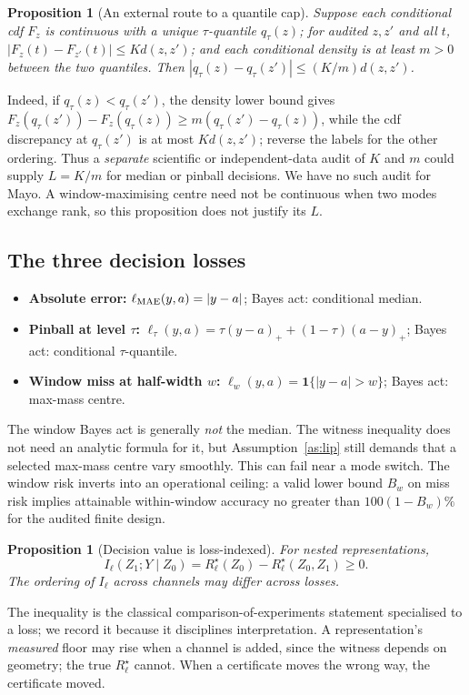 \documentclass[11pt]{article}
\newtheorem{proposition}[theorem]{Proposition}
\theoremstyle{definition}
\newcommand{\risk}{R^{\star}}
\newcommand{\ind}{\mathbf{1}}
\begin{document}
\begin{proposition}[An external route to a quantile cap]\label{prop:quantlip}
Suppose each conditional cdf $F_z$ is continuous with a unique $\tau$-quantile $q_\tau(z)$; for audited $z,z'$ and all $t$, $|F_z(t)-F_{z'}(t)|\le Kd(z,z')$; and each conditional density is at least $m>0$ between the two quantiles. Then $|q_\tau(z)-q_\tau(z')|\le(K/m)d(z,z')$.
\end{proposition}
Indeed, if $q_\tau(z)<q_\tau(z')$, the density lower bound gives $F_z(q_\tau(z'))-F_z(q_\tau(z))\ge m(q_\tau(z')-q_\tau(z))$, while the cdf discrepancy at $q_\tau(z')$ is at most $Kd(z,z')$; reverse the labels for the other ordering. Thus a \emph{separate} scientific or independent-data audit of $K$ and $m$ could supply $L=K/m$ for median or pinball decisions. We have no such audit for Mayo. A window-maximising centre need not be continuous when two modes exchange rank, so this proposition does not justify its $L$.

\subsection{The three decision losses}

\begin{itemize}\itemsep1pt
\item \textbf{Absolute error:} $\ell_{\rm MAE}(y,a)=|y-a|$; Bayes act: conditional median.
\item \textbf{Pinball at level $\tau$:} $\ell_\tau(y,a)=\tau(y-a)_+ +(1-\tau)(a-y)_+$; Bayes act: conditional $\tau$-quantile.
\item \textbf{Window miss at half-width $w$:} $\ell_w(y,a)=\ind\{|y-a|>w\}$; Bayes act: max-mass centre.
\end{itemize}
The window Bayes act is generally \emph{not} the median. The witness inequality does not need an analytic formula for it, but Assumption~\ref{as:lip} still demands that a selected max-mass centre vary smoothly. This can fail near a mode switch. The window risk inverts into an operational ceiling: a valid lower bound $B_w$ on miss risk implies attainable within-window accuracy no greater than $100(1-B_w)\%$ for the audited finite design.

\begin{proposition}[Decision value is loss-indexed]\label{prop:info}
For nested representations,
\[
I_\ell(Z_1;Y\mid Z_0)=\risk_\ell(Z_0)-\risk_\ell(Z_0,Z_1)\ge 0.
\]
The ordering of $I_\ell$ across channels may differ across losses.
\end{proposition}
The inequality is the classical comparison-of-experiments statement \citep{blackwell} specialised to a loss; we record it because it disciplines interpretation. A representation's \emph{measured} floor may rise when a channel is added, since the witness depends on geometry; the true $\risk_\ell$ cannot. When a certificate moves the wrong way, the certificate moved.
\end{document}
